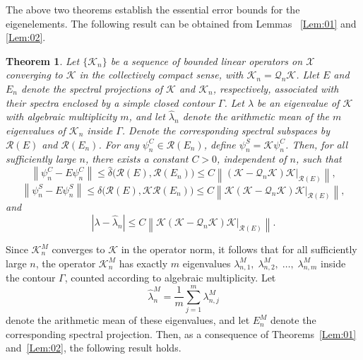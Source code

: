 \documentclass[]{interact}
\theoremstyle{plain}%
\newtheorem{theorem}{Theorem}[section]
\theoremstyle{definition}
\theoremstyle{remark}
\newcommand{\norm}[1]{\left\lVert #1\right\rVert}
\begin{document}
\noindent
The above two theorems establish the essential error bounds for the eigenelements. The following result can be obtained from Lemmas~ \ref{Lem:01} and \ref{Lem:02}.

\begin{theorem}\label{Thm:01}
	Let $\{\mathcal{K}_n\}$ be a sequence of bounded linear operators on $\mathcal{X}$ converging to $\mathcal{K}$ in the collectively compact sense, with
	$\mathcal{K}_n = \mathcal{Q}_n \mathcal{K}$. Llet $E$ and $E_n$ denote the spectral
	projections of $\mathcal{K}$ and $\mathcal{K}_n$, respectively, associated with their
	spectra enclosed by a simple closed contour $\Gamma$.
	Let $\lambda$ be an eigenvalue of $\mathcal{K}$ with algebraic multiplicity $m$, and let
	$\hat{\lambda}_n$ denote the arithmetic mean of the $m$ eigenvalues of $\mathcal{K}_n$ inside $\Gamma$. Denote the corresponding spectral subspaces by $\mathcal{R}(E)$ and $\mathcal{R}(E_n)$. For any $\psi_n^C \in\mathcal{R}(E_n)$, define $\psi_n^{S}=\mathcal{K}\psi_n^C$. Then, for all sufficiently large $n$, there exists a constant $C>0$, independent of $n$, such that
	\begin{equation*} \label{eq: st_roc}
		\norm{\psi_n^C - E \psi_n^C} \leq \hat{\delta} \big(\mathcal{R}(E), \mathcal{R}(E_n)\big) \leq C \norm{(\mathcal{K} - \mathcal{Q}_n \mathcal{K})\mathcal{K}|_{\mathcal{R}(E)}},
	\end{equation*}
	\begin{equation*} \label{eq: it_roc}
		\norm{\psi_n^S - E \psi_n^S} \leq \delta\big(\mathcal{R}(E), \mathcal{K} \mathcal{R}(E_n)\big) \leq C \norm{\mathcal{K}(\mathcal{K} - \mathcal{Q}_n \mathcal{K})\mathcal{K}|_{\mathcal{R}(E)}},
	\end{equation*}
	and 
	\begin{equation*} \label{eq: st_eig}
		| \lambda - \hat{\lambda}_n | \leq C \norm{ \mathcal{K}(\mathcal{K} - \mathcal{Q}_n \mathcal{K})\mathcal{K}|_{\mathcal{R}(E)}}.
	\end{equation*}
\end{theorem}



Since $\mathcal{K}_n^M$ converges to $\mathcal{K}$ in the operator norm, it follows
that for all sufficiently large $n$, the operator $\mathcal{K}_n^M$ has exactly
$m$ eigenvalues
\(
\lambda_{n,1}^M,\; \lambda_{n,2}^M,\; \dots,\; \lambda_{n,m}^M
\)
inside the contour $\Gamma$, counted according to algebraic multiplicity.
Let
\[
\hat{\lambda}_n^M
=
\frac{1}{m}\sum_{j=1}^{m}\lambda_{n,j}^M
\]
denote the arithmetic mean of these eigenvalues, and let $E_n^M$ denote the
corresponding spectral projection. Then, as a consequence of Theorems~\ref{Lem:01} and~\ref{Lem:02}, the following result holds.
\end{document}
